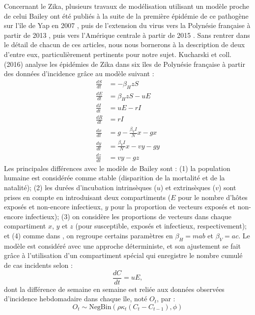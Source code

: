 Concernant le Zika, plusieurs travaux de modélisation utilisant un modèle proche de celui Bailey ont été publiés à la suite de la première épidémie de ce pathogène sur l'île de Yap en 2007 \cite{funk2016comparative}, puis de l'extension du virus vers la Polynésie française à partir de 2013 \cite{kucharski_transmission_2016,Champagne064949}, puis vers l'Amérique centrale à partir de 2015 \cite{zhang_spread_2017,gao2016prevention}.
Sans rentrer dans le détail de chacun de ces articles, nous nous bornerons à la description de deux d'entre eux, particulièrement pertinents pour notre sujet.
Kucharski et coll. (2016) \cite{kucharski_transmission_2016} analyse les épidémies de Zika dans six îles de Polynésie française à partir des données d'incidence  grâce au modèle suivant :
\begin{align}
\label{eq:kuch}
\frac{dS}{dt} &= -\beta_HzS \\ \nonumber
\frac{dE}{dt} &= \beta_HzS - uE \\ \nonumber
\frac{dI}{dt} &= uE - rI \\ \nonumber
\frac{dR}{dt} &= rI \\  \nonumber
\frac{dx}{dt} &= g - \frac{\beta_VI}{N}x - gx \\ \nonumber
\frac{dy}{dt} &= \frac{\beta_VI}{N}x - v y - gy \\ \nonumber
\frac{dz}{dt} &= v y - gz
\end{align}
Les principales différences avec le modèle de Bailey sont : (1) la population humaine est considérée comme stable (disparition de la mortalité et de la natalité); (2) les durées d'incubation intrinsèques ($u$) et extrinsèques ($v$) sont prises en compte en introduisant deux compartiments ($E$ pour le nombre d'hôtes exposés et non-encore infectieux, $y$ pour la proportion de vecteurs exposés et non-encore infectieux); (3) on considère les proportions de vecteurs dans chaque compartiment $x$, $y$ et $z$ (pour susceptible, exposés et infectieux, respectivement); et (4) comme dans \cite{yakob_mathematical_2013}, on regroupe certains paramètres en $\beta_H = mab$ et $\beta_V = ac$.
Le modèle est considéré avec une approche déterministe, et son ajustement se fait grâce à l'utilisation d'un compartiment spécial qui enregistre le nombre cumulé de cas incidents selon :
\begin{equation}
\frac{dC}{dt} = uE,
\end{equation}
dont la différence de semaine en semaine est reliée aux données observées d'incidence hebdomadaire dans chaque île, noté $O_t$, par :
\begin{equation}
O_t \sim \text{NegBin}(\rho \kappa_t (C_{t}-C_{t-1}), \phi)
\end{equation}
